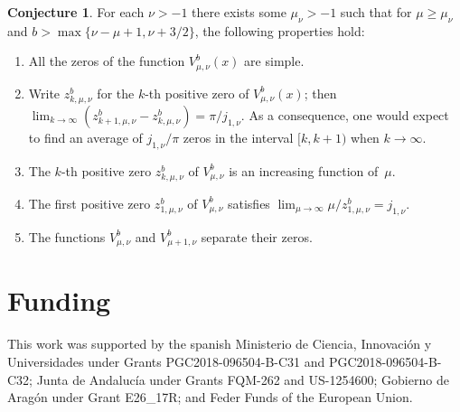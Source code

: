 \documentclass[10pt,a4paper]{article}
\numberwithin{equation}{section}
\theoremstyle{plain}
\theoremstyle{definition}
\newtheorem{Conjecture}{Conjecture}[section]
\begin{document}
\begin{Conjecture}
For each $\nu>-1$ there exists some $\mu_{\nu}>-1$ such that for $\mu\ge \mu_\nu$ and $b>\max\{\nu-\mu+1,\nu+3/2\}$, the following properties hold:
\begin{enumerate}
\item All the zeros of the function $V_{\mu,\nu}^{b}(x)$ are simple.
\item Write $z_{k,\mu,\nu}^b$ for the $k$-th positive zero of $V_{\mu,\nu}^{b}(x)$; then
$
   \lim_{k\to \infty} (z_{k+1,\mu,\nu}^b-z_{k,\mu,\nu}^b) = {\pi}/{j_{1,\nu}}.
$
As a consequence, one would expect to find an average of $j_{1,\nu}/\pi$ zeros in the interval $[k,k+1)$ when $k\to \infty$.
\item The $k$-th positive zero $z_{k,\mu,\nu}^b$ of $V_{\mu,\nu}^{b}$ is an increasing function of~$\mu$.
\item The first positive zero $z_{1,\mu,\nu}^b$ of $V_{\mu,\nu}^{b}$ satisfies
$
   \lim_{\mu\to \infty} {\mu}/{z_{1,\mu,\nu}^b} = j_{1,\nu}.
$
\item The functions $V_{\mu,\nu }^{b}$ and $V_{\mu +1,\nu }^{b}$ separate their zeros.
\end{enumerate}
\end{Conjecture}

\section*{Funding}


This work was supported by the spanish
Minis\-te\-rio de Cien\-cia, Inno\-va\-ci\'on y Uni\-ver\-si\-da\-des 
under Grants PGC2018-096504-B-C31 and PGC2018-096504-B-C32;
Jun\-ta de Anda\-lu\-c\'ia under Grants FQM-262 and US-1254600;
Go\-bier\-no de Ara\-g\'on under Grant E26\_17R;
and Feder Funds of the European Union.

\end{document}
